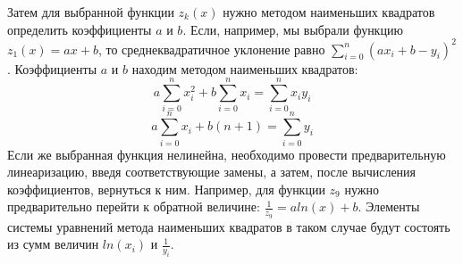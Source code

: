 \documentclass[a4paper, 14pt]{extarticle}
\begin{document}
\begin{justify}
Затем для выбранной функции $z_k(x)$ нужно методом наименьших квадратов определить коэффициенты $a$ и $b$. 
Если, например, мы выбрали функцию $z_1(x) = ax + b$, то среднеквадратичное уклонение равно 
$\sum_{i=0}^n \left( a x_i + b - y_i \right)^2$. Коэффициенты $a$ и $b$ находим методом наименьших квадратов: \\
\[
a \sum_{i=0}^n x_i^2 + b \sum_{i=0}^n x_i = \sum_{i=0}^n x_i y_i
\]
\[
a \sum_{i=0}^n x_i + b (n+1) = \sum_{i=0}^n y_i
\]
Если же выбранная функция нелинейна, необходимо провести предварительную линеаризацию, введя 
соответствующие замены, а затем, после вычисления коэффициентов, вернуться к ним.
Например, для функции $z_9$ нужно предварительно перейти к обратной величине: $\frac{1}{z_9} = aln(x) + b$. Элементы 
системы уравнений метода наименьших квадратов в таком случае будут состоять из сумм величин $ln(x_i)$ и $\frac{1}{y_i}$.




\end{justify}
\pagebreak
\end{document}

